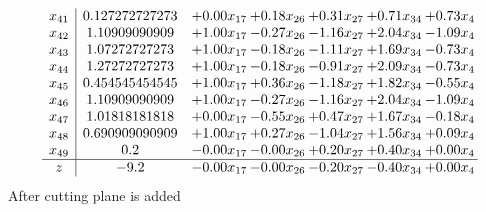 \documentclass[8pt]{article}
\begin{document}
\[\begin{array}{c| c c@{\hskip 2pt} c@{\hskip 2pt} c@{\hskip 2pt} c@{\hskip 2pt} c@{\hskip 2pt} }
 x_{41}   &  0.127272727273 & +  0.00 x_{17} & +  0.18 x_{26} & +  0.31 x_{27} & +  0.71 x_{34} & +  0.73 x_{4}\\
 x_{42}   &  1.10909090909 & +  1.00 x_{17} & -0.27 x_{26} & -1.16 x_{27} & +  2.04 x_{34} & -1.09 x_{4}\\
 x_{43}   &  1.07272727273 & +  1.00 x_{17} & -0.18 x_{26} & -1.11 x_{27} & +  1.69 x_{34} & -0.73 x_{4}\\
 x_{44}   &  1.27272727273 & +  1.00 x_{17} & -0.18 x_{26} & -0.91 x_{27} & +  2.09 x_{34} & -0.73 x_{4}\\
 x_{45}   &  0.454545454545 & +  1.00 x_{17} & +  0.36 x_{26} & -1.18 x_{27} & +  1.82 x_{34} & -0.55 x_{4}\\
 x_{46}   &  1.10909090909 & +  1.00 x_{17} & -0.27 x_{26} & -1.16 x_{27} & +  2.04 x_{34} & -1.09 x_{4}\\
 x_{47}   &  1.01818181818 & +  0.00 x_{17} & -0.55 x_{26} & +  0.47 x_{27} & +  1.67 x_{34} & -0.18 x_{4}\\
 x_{48}   &  0.690909090909 & +  1.00 x_{17} & +  0.27 x_{26} & -1.04 x_{27} & +  1.56 x_{34} & +  0.09 x_{4}\\
 x_{49}   &  0.2 & -0.00 x_{17} & -0.00 x_{26} & +  0.20 x_{27} & +  0.40 x_{34} & +  0.00 x_{4}\\
\hline
z    &  -9.2 & -0.00 x_{17} & -0.00 x_{26} & -0.20 x_{27} & -0.40 x_{34} & +  0.00 x_{4}\\
\end{array}\]
 After cutting plane is added 
\end{document}
